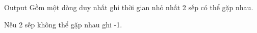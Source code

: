 Output
Gồm một dòng duy nhất ghi thời gian nhỏ nhất 2 sếp có thể gặp nhau.

Nếu 2 sếp không thể gặp nhau ghi -1.